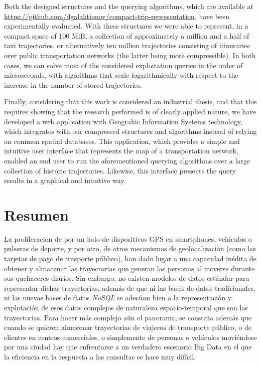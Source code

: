 Both the designed structures and the querying algorithms, which are available at \url{https://github.com/dgalaktionov/compact-trip-representation}, have been experimentally evaluated. With these structures we were able to represent, in a compact space of 100 MiB, a collection of approximately a million and a half of taxi trajectories, or alternatively ten million trajectories consisting of itineraries over public transportation networks (the latter being more compressible). In both cases, we can solve most of the considered exploitation queries in the order of microseconds, with algorithms that scale logarithmically with respect to the increase in the number of stored trajectories.

Finally, considering that this work is considered an industrial thesis, and that this requires showing that the research performed is of clearly applied nature, we have developed a web application with Geograhic Information Systems technology, which integrates with our compressed structures and algorithms instead of relying on common spatial databases. This application, which provides a simple and intuitive user interface that represents the map of a transportation network, enabled an end user to run the aforementioned querying algorithms over a large collection of historic trajectories. Likewise, this interface presents the query results in a graphical and intuitive way.

\chapter*{Resumen}

La proliferaci\'on de por un lado de dispositivos GPS en smartphones, veh\'iculos o pulseras de deporte,  y por otro, de otros mecanismos de geolocalizaci\'on (como las tarjetas de pago de trasporte p\'ublico), han dado lugar a una capacidad in\'edita de obtener y almacenar las trayectorias que generan las personas al moverse durante sus quehaceres diarios. Sin embargo, no existen modelos de datos est\'andar para representar dichas trayectorias, adem\'as de que ni las bases de datos tradicionales, ni las nuevas bases de datos \textit{NoSQL} se adec\'uan bien a la representaci\'on y explotaci\'on de esos datos complejos de naturaleza \mbox{espacio-temporal} que son las trayectorias.  Para hacer m\'as complejo a\'un el panorama, se constata adem\'as que cuando se quieren almacenar trayectorias de viajeros de transporte p\'ublico, o de clientes en centros comerciales, o simplemente de personas o veh\'iculos movi\'endose por una ciudad hay que enfrentarse a un verdadero escenario Big Data en el que la eficiencia en la respuesta a las consultas se hace muy dif\'icil.

